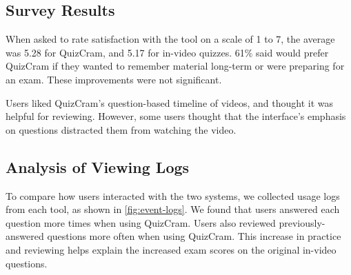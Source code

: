 \documentclass{sigchi}
\begin{document}

\subsection{Survey Results}

When asked to rate satisfaction with the tool on a scale of 1 to 7, the average was 5.28 for QuizCram, and 5.17 for in-video quizzes.  61\% said would prefer QuizCram if they wanted to remember material long-term or were preparing for an exam. These improvements were not significant.

Users liked QuizCram's question-based timeline of videos, and thought it was helpful for reviewing. However, some users thought that the interface's emphasis on questions distracted them from watching the video.

\subsection{Analysis of Viewing Logs}


To compare how users interacted with the two systems, we collected usage logs from each tool, as shown in \autoref{fig:event-logs}. We found that users answered each question more times when using QuizCram. Users also reviewed previously-answered questions more often when using QuizCram. This increase in practice and reviewing helps explain the increased exam scores on the original in-video questions. %

\end{document}
